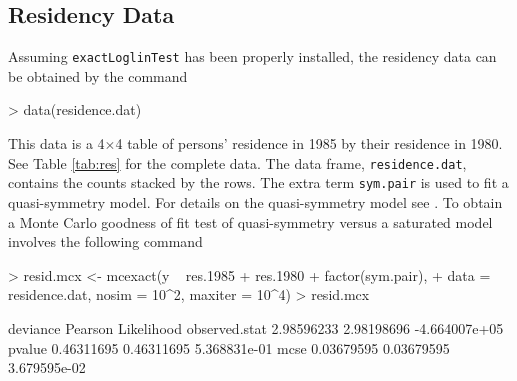 \documentclass[a4paper]{article}
\begin{document}
\subsection{Residency Data}
Assuming \texttt{exactLoglinTest} has been properly installed, the residency data can
be obtained by the command
\begin{Schunk}
\begin{Sinput}
> data(residence.dat)
\end{Sinput}
\end{Schunk}
This data is a 4$\times$4 table of persons' residence in 1985 by
their residence in 1980. See Table \ref{tab:res} for the complete
data.  The data frame, \texttt{residence.dat}, contains the counts
stacked by the rows. The extra term \texttt{sym.pair} is used to fit
a quasi-symmetry model.  For details on the quasi-symmetry model see
\cite{agre:1990}.  To obtain a Monte Carlo goodness of fit test of
quasi-symmetry versus a saturated model involves the following command
\begin{Schunk}
\begin{Sinput}
> resid.mcx <- mcexact(y ~ res.1985 + res.1980 + factor(sym.pair), 
+     data = residence.dat, nosim = 10^2, maxiter = 10^4)
> resid.mcx
\end{Sinput}
\begin{Soutput}
                deviance    Pearson    Likelihood
observed.stat 2.98596233 2.98198696 -4.664007e+05
pvalue        0.46311695 0.46311695  5.368831e-01
mcse          0.03679595 0.03679595  3.679595e-02
\end{Soutput}
\end{Schunk}
\end{document}
